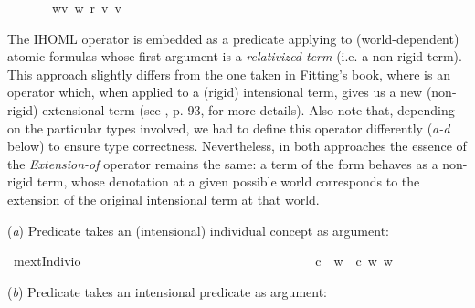 \begin{isabellebody}
\ \ \ \ \ {\isachardoublequoteopen}\isactrlbold {\isasymdiamond}{\isasymphi}\ {\isasymequiv}\ {\isasymlambda}w{\isachardot}{\isasymexists}v{\isachardot}\ {\isacharparenleft}w\ r\ v{\isacharparenright}{\isasymand}{\isacharparenleft}{\isasymphi}\ v{\isacharparenright}{\isachardoublequoteclose}%
\isamarkuptrue%
%
\begin{isamarkuptext}%
The IHOML operator \isa{{\isasymdown}} is embedded as a predicate applying to (world-dependent) atomic formulas
 whose first argument is a \emph{relativized term} (i.e. a non-rigid term). This approach slightly differs from  
 the one taken in Fitting's book, where \isa{{\isasymdown}} is an operator which, when applied to a (rigid) intensional term,
 gives us a new (non-rigid) extensional term (see \cite{Fitting}, p. 93, for more details). Also note that,
 depending on the particular types involved, we had to define this operator differently (\emph{a-d} below) to ensure 
 type correctness.
 Nevertheless, in both approaches the essence of the \emph{Extension-of} operator remains the same:
 a term of the form \isa{{\isasymdown}{\isasymphi}} behaves as a non-rigid term, whose denotation at a given possible world corresponds
 to the extension of the original intensional term \isa{{\isasymphi}} at that world.%
\end{isamarkuptext}\isamarkuptrue%
%
\begin{isamarkuptext}%
(\emph{a}) Predicate \isa{{\isasymphi}} takes an (intensional) individual concept as argument:%
\end{isamarkuptext}\isamarkuptrue%
\isamarkupfalse%
\ mextIndiv{\isacharcolon}{\isacharcolon}{\isachardoublequoteopen}{\isasymup}{\isasymlangle}{\isasymzero}{\isasymrangle}{\isasymRightarrow}{\isasymup}{\isasymzero}{\isasymRightarrow}io{\isachardoublequoteclose}\ {\isacharparenleft}\ {\isachardoublequoteopen}\isactrlbold {\isasymdownharpoonleft}{\isachardoublequoteclose}\ {}{}{\isacharparenright}\ \ \ \ \ \ \ \ \ \ \ \ \ \ \ \ \ \ \ \ \ \ \ \ \ \ \ \ \ \isanewline
\ \ \ {\isachardoublequoteopen}{\isasymphi}\ \isactrlbold {\isasymdownharpoonleft}c\ {\isasymequiv}\ {\isasymlambda}w{\isachardot}\ {\isasymphi}\ {\isacharparenleft}c\ w{\isacharparenright}\ w{\isachardoublequoteclose}%
\begin{isamarkuptext}%
(\emph{b}) Predicate \isa{{\isasymphi}} takes an intensional predicate as argument:%
\end{isamarkuptext}\isamarkuptrue%

\end{isabellebody}
